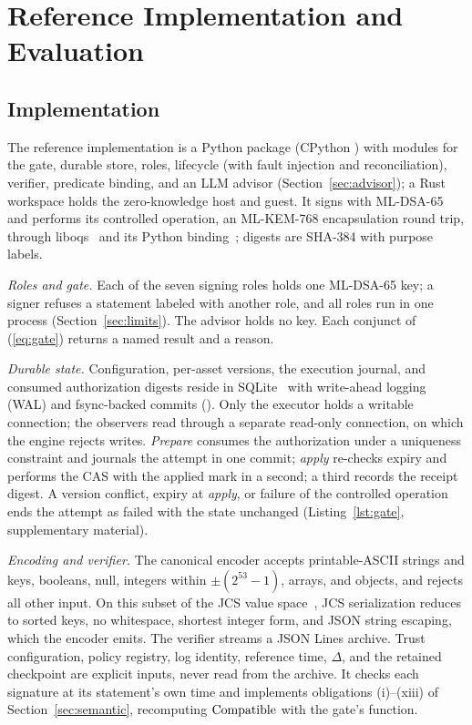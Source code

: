 \section{Reference Implementation and Evaluation}
\label{sec:proto}

\subsection{Implementation}
The reference implementation is a Python package (CPython \EnvPython) with modules for the gate, durable store, roles, lifecycle (with fault injection and reconciliation), verifier, predicate binding, and an LLM advisor (Section~\ref{sec:advisor}); a Rust workspace holds the zero-knowledge host and guest. It signs with ML-DSA-65 and performs its controlled operation, an ML-KEM-768 encapsulation round trip, through liboqs \EnvLiboqs\ and its Python binding~\cite{liboqs}; digests are SHA-384 with purpose labels.

\emph{Roles and gate.} Each of the seven signing roles holds one ML-DSA-65 key; a signer refuses a statement labeled with another role, and all roles run in one process (Section~\ref{sec:limits}). The advisor holds no key. Each conjunct of (\ref{eq:gate}) returns a named result and a reason.

\emph{Durable state.} Configuration, per-asset versions, the execution journal, and consumed authorization digests reside in SQLite \EnvSqlite\ with write-ahead logging (WAL) and fsync-backed commits (). Only the executor holds a writable connection; the observers read through a separate read-only connection, on which the engine rejects writes. \emph{Prepare} consumes the authorization under a uniqueness constraint and journals the attempt in one commit; \emph{apply} re-checks expiry and performs the CAS with the applied mark in a second; a third records the receipt digest. A version conflict, expiry at \emph{apply}, or failure of the controlled operation ends the attempt as failed with the state unchanged (Listing~\ref{lst:gate}, supplementary material).

\emph{Encoding and verifier.} The canonical encoder accepts printable-ASCII strings and keys, booleans, null, integers within $\pm(2^{53}-1)$, arrays, and objects, and rejects all other input. On this subset of the JCS value space~\cite{jcs}, JCS serialization reduces to sorted keys, no whitespace, shortest integer form, and JSON string escaping, which the encoder emits. The verifier streams a JSON Lines archive. Trust configuration, policy registry, log identity, reference time, $\Delta$, and the retained checkpoint are explicit inputs, never read from the archive. It checks each signature at its statement's own time and implements obligations (i)--(xiii) of Section~\ref{sec:semantic}, recomputing $\mathrm{Compatible}$ with the gate's function.

